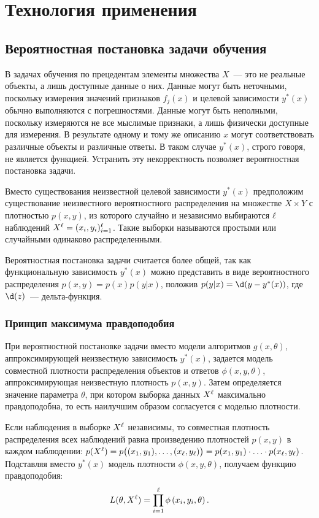 \chapter{Технология применения}
\section{Вероятностная постановка задачи обучения}
В задачах обучения по прецедентам элементы множества \( X \)~--- это не реальные объекты, а лишь
доступные данные о них. Данные могут быть неточными, поскольку измерения значений признаков
\( f_j(x) \) и целевой зависимости \( y^*(x) \) обычно выполняются с погрешностями. Данные могут быть
неполными, поскольку измеряются не все мыслимые признаки, а лишь физически доступные для измерения.
В результате одному и тому же описанию \( x \) могут соответствовать различные объекты и различные
ответы. В таком случае \( y^*(x) \), строго говоря, не является функцией. Устранить эту некорректность
позволяет вероятностная постановка задачи.

Вместо существования неизвестной целевой зависимости \( y^*(x) \) предположим существование
неизвестного вероятностного распределения на множестве \( X\times Y \) с плотностью \( p(x, y) \), из
которого случайно и независимо выбираются \( \ell \) наблюдений \( X^\ell = (x_i, y_i)^\ell_{i = 1} \). Такие
выборки называются простыми или случайными одинаково распределенными.

Вероятностная постановка задачи считается более общей, так как функциональную зависимость \( y^*(x) \)
можно представить в виде вероятностного распределения \( p(x, y) = p(x)p(y|x) \), положив
\( p(y|x) = \d(y - y^*(x)) \), где \( \d(z) \)~--- дельта-функция.

\subsection{Принцип максимума правдоподобия}
При вероятностной постановке задачи вместо модели алгоритмов \( g(x, \theta) \), аппроксимирующей
неизвестную зависимость \( y^*(x) \), задается модель совместной плотности распределения объектов и
ответов \( \phi(x, y, \theta) \), аппроксимирующая неизвестную плотность \( p(x, y) \). Затем
определяется значение параметра \( \theta \), при котором выборка данных \( X^\ell \) максимально
правдоподобна, то есть наилучшим образом согласуется с моделью плотности.

Если наблюдения в выборке \( X^\ell \) независимы, то совместная плотность распределения всех наблюдений
равна произведению плотностей \( p(x, y) \) в каждом наблюдении:
\( p(X^\ell) = p\bigl((x_1, y_1), \ldots , (x_\ell, y_\ell)\bigr) = p(x_1, y_1)\cdot\ldots\cdot
p(x_\ell, y_\ell) \). Подставляя вместо \( y^*(x) \) модель плотности
\( \phi(x, y, \theta) \), получаем функцию правдоподобия:
\begin{equation}
  L(\theta, X^\l) = \prod_{i = 1}^\l \phi\left(x_i, y_i, \theta\right).
  \label{eq:3}
\end{equation}

